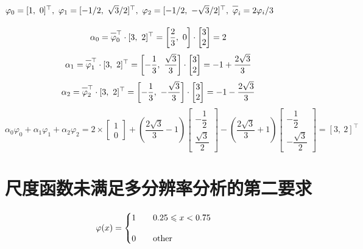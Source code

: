 \documentclass{article}
\newcommand{\barline}[1]{\overline{#1\rule{0pt}{1.5ex}}}
\begin{document}
\subsection{$\varphi_0=[1,\ 0]^{\top},\ \varphi_1=[-1/2,\ \sqrt{3}/2]^{\top},\ \varphi_2=[-1/2,\ -\sqrt{3}/2]^{\top},\ \barline{\varphi}_i=2\varphi_i/3$}


\[ \alpha_0=\barline{\varphi}_0^{\top}\cdot[3,\ 2]^{\top}=\left[\dfrac{2}{3},\ 0\right]\cdot\left[\begin{matrix}
    3
    \\
    2
\end{matrix}\right]=2 \]
\[ \alpha_1=\barline{\varphi}_1^{\top}\cdot[3,\ 2]^{\top}=\left[-\dfrac{1}{3},\ \dfrac{\sqrt{3}}{3}\right]\cdot\left[\begin{matrix}
    3
    \\
    2
\end{matrix}\right]=-1+\dfrac{2\sqrt{3}}{3} \]
\[ \alpha_2=\barline{\varphi}_2^{\top}\cdot[3,\ 2]^{\top}=\left[-\dfrac{1}{3},\ -\dfrac{\sqrt{3}}{3}\right]\cdot\left[\begin{matrix}
    3
    \\
    2
\end{matrix}\right]=-1-\dfrac{2\sqrt{3}}{3} \]
\[ \alpha_0\varphi_0+\alpha_1\varphi_1+\alpha_2\varphi_2=2\times\left[\begin{matrix}
    1
    \\[10pt]
    0
\end{matrix}\right]+\left(\dfrac{2\sqrt{3}}{3}-1\right)\left[\begin{matrix}
    -\dfrac{1}{2}
    \\[10pt]
    \dfrac{\sqrt{3}}{2}
\end{matrix}\right]-\left(\dfrac{2\sqrt{3}}{3}+1\right)\left[\begin{matrix}
    -\dfrac{1}{2}
    \\[10pt]
    -\dfrac{\sqrt{3}}{2}
\end{matrix}\right]=[3,\ 2]^{\top} \]



\section{尺度函数未满足多分辨率分析的第二要求}
\[ \varphi(x)=\begin{cases}
    1\qquad0.25\leqslant x<0.75
    \\[10pt]
    0\qquad\rm other
\end{cases} \]
\end{document}
